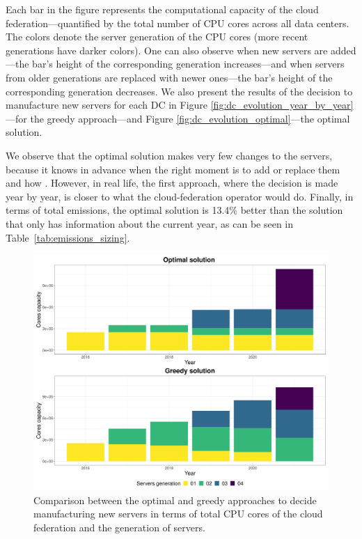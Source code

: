Each bar in the figure represents the computational capacity of the cloud federation---quantified by the total number of CPU cores across all data centers. The colors denote the server generation of the CPU cores  (more recent generations have darker colors). One can also observe when new servers are added---the bar's height of the corresponding generation increases---and when servers from older generations are replaced with newer ones---the bar's height of the corresponding generation decreases. We also present the results of the decision to manufacture new servers for each DC in Figure \ref{fig:dc_evolution_year_by_year}---for the greedy approach---and Figure \ref{fig:dc_evolution_optimal}---the optimal solution.

We observe that the optimal solution makes very few changes to the servers, because it knows in advance when the right moment is to add or replace them and how . However, in real life, the first approach, where the decision is made year by year, is closer to what the cloud-federation operator would do. Finally, in terms of total  emissions, the optimal solution is 13.4\% better than the solution that only has information about the current year, as can be seen in Table~\ref{tab:emissions_sizing}.

\begin{figure}[ht]
\centering 
  \includegraphics[width=\linewidth]{images/cloud_federation_evolution_lifetime.png}
  \caption{Comparison between the optimal and greedy approaches to decide manufacturing new servers in terms of total CPU cores of the cloud federation and the generation of servers.}
  \label{fig:dc_evolution_comparison}
\end{figure}


